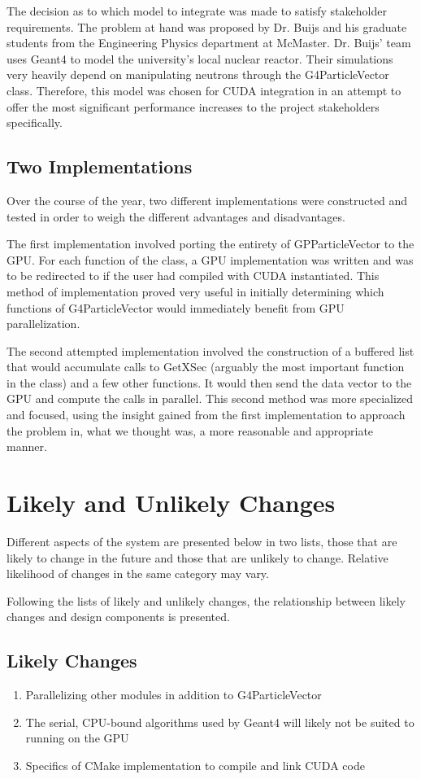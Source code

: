 \documentclass[12pt]{article}
\begin{document}
The decision as to which model to integrate was made to satisfy stakeholder requirements. The problem at hand was proposed by Dr. Buijs and his graduate students from the Engineering Physics department at McMaster. Dr. Buijs' team uses Geant4 to model the university's local nuclear reactor. Their simulations very heavily depend on manipulating neutrons through the G4ParticleVector class. Therefore, this model was chosen for CUDA integration in an attempt to offer the most significant performance increases to the project stakeholders specifically.

\subsection{Two Implementations}
Over the course of the year, two different implementations were constructed and tested in order to weigh the different advantages and disadvantages. 

The first implementation involved porting the entirety of GPParticleVector to the GPU. For each function of the class, a GPU implementation was written and was to be redirected to if the user had compiled with CUDA instantiated. This method of implementation proved very useful in initially determining which functions of G4ParticleVector would immediately benefit from GPU parallelization. 

The second attempted implementation involved the construction of a buffered list that would accumulate calls to GetXSec (arguably the most important function in the class) and a few other functions. It would then send the data vector to the GPU and compute the calls in parallel. This second method was more specialized and focused, using the insight gained from the first implementation to approach the problem in, what we thought was, a more reasonable and appropriate manner. 

\section{Likely and Unlikely Changes}
Different aspects of the system are presented below in two lists, those that are likely to change in the future and those that are unlikely to change. Relative likelihood of changes in the same category may vary.

Following the lists of likely and unlikely changes, the relationship between likely changes and design components is presented.

\subsection{Likely Changes}\label{Sec_LikelyChanges} %
\begin{enumerate}
\item Parallelizing other modules in addition to G4ParticleVector
\item The serial, CPU-bound algorithms used by Geant4 will likely not be suited to running on the GPU
\item Specifics of CMake implementation to compile and link CUDA code
\end{enumerate}
\end{document}
